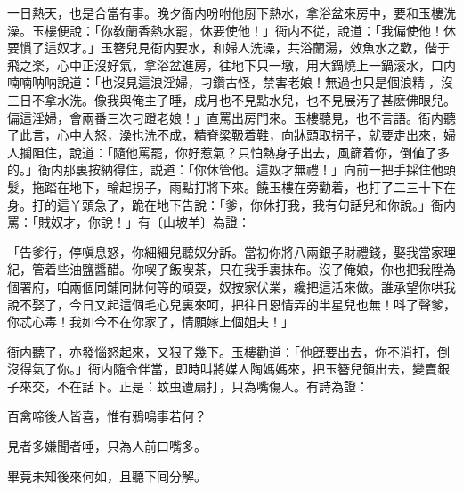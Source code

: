 一日熱天，也是合當有事。晚夕衙内吩咐他厨下熱水，拿浴盆來房中，要和玉樓洗澡。玉樓便說：「你敎蘭香熱水罷，休要使他！」衙内不従，說道：「我偏使他！休要慣了這奴才。」玉簪兒見衙内要水，和婦人洗澡，共浴蘭湯，效魚水之歡，偕于飛之楽，心中正沒好氣，拿浴盆進房，往地下只一墩，用大鍋燒上一鍋滚水，口内喃喃呐呐說道：「也沒見這浪淫婦，刁鑽古怪，禁害老娘！無過也只是個浪精𣭈，沒三日不拿水洗。像我與俺主子睡，成月也不見點水兒，也不見展汚了甚麽佛眼兒。偏這淫婦，會兩番三次刁蹬老娘！」直罵出房門來。玉樓聽見，也不言語。衙内聽了此言，心中大怒，澡也洗不成，精脊梁靸着鞋，向牀頭取拐子，就要走出來，婦人攔阻住，說道：「隨他罵罷，你好惹氣？只怕熱身子出去，風篩着你，倒値了多的。」衙内那裏按納得住，説道：「你休管他。這奴才無禮！」向前一把手採住他頭髮，拖踏在地下，輪起拐子，雨點打將下來。饒玉樓在旁勸着，也打了二三十下在身。打的這丫頭急了，跪在地下告說：「爹，你休打我，我有句話兒和你說。」衙内罵：「賊奴才，你說！」有〔山坡羊〕為證：

\begin{myquote}
「告爹行，停嗔息怒，你細細兒聽奴分訴。當初你將八兩銀子財禮錢，娶我當家理紀，管着些油鹽醬醋。你喫了飯喫茶，只在我手裏抹布。沒了俺娘，你也把我陞為個署府，咱兩個同鋪同牀何等的頑耍，奴按家伏業，纔把這活來做。誰承望你哄我說不娶了，今日又起這個毛心兒裏來呵，把往日恩情弄的半星兒也無！呌了聲爹，你忒心毒！我如今不在你家了，情願嫁上個姐夫！」
\end{myquote}

衙内聽了，亦發惱怒起來，又狠了幾下。玉樓勸道：「他旣要出去，你不消打，倒沒得氣了你。」衙内隨令伴當，即時叫將媒人陶媽媽來，把玉簪兒領出去，變賣銀子來交，不在話下。正是：蚊虫遭扇打，只為嘴傷人。有詩為證：

\begin{myquote}
百禽啼後人皆喜，惟有鴉鳴事若何？

見者多嫌聞者唾，只為人前口嘴多。
\end{myquote}

畢竟未知後來何如，且聽下囘分解。

